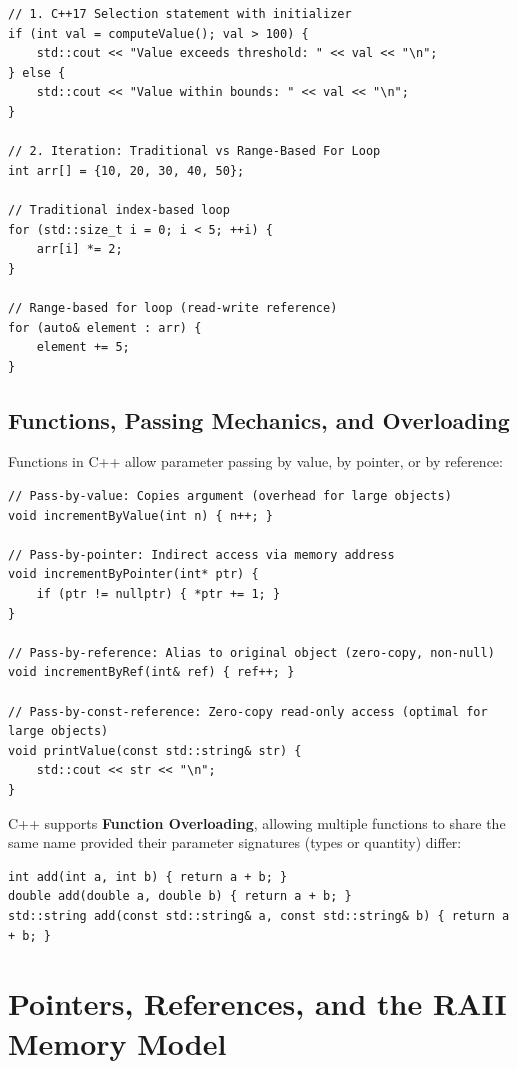 \documentclass[10pt,journal,compsoc,onecolumn]{IEEEtran}
\begin{document}
\begin{verbatim}
// 1. C++17 Selection statement with initializer
if (int val = computeValue(); val > 100) {
    std::cout << "Value exceeds threshold: " << val << "\n";
} else {
    std::cout << "Value within bounds: " << val << "\n";
}

// 2. Iteration: Traditional vs Range-Based For Loop
int arr[] = {10, 20, 30, 40, 50};

// Traditional index-based loop
for (std::size_t i = 0; i < 5; ++i) {
    arr[i] *= 2;
}

// Range-based for loop (read-write reference)
for (auto& element : arr) {
    element += 5;
}
\end{verbatim}

\subsection{Functions, Passing Mechanics, and Overloading}
Functions in C++ allow parameter passing by value, by pointer, or by reference:

\begin{verbatim}
// Pass-by-value: Copies argument (overhead for large objects)
void incrementByValue(int n) { n++; }

// Pass-by-pointer: Indirect access via memory address
void incrementByPointer(int* ptr) {
    if (ptr != nullptr) { *ptr += 1; }
}

// Pass-by-reference: Alias to original object (zero-copy, non-null)
void incrementByRef(int& ref) { ref++; }

// Pass-by-const-reference: Zero-copy read-only access (optimal for large objects)
void printValue(const std::string& str) {
    std::cout << str << "\n";
}
\end{verbatim}

C++ supports \textbf{Function Overloading}, allowing multiple functions to share the same name provided their parameter signatures (types or quantity) differ:

\begin{verbatim}
int add(int a, int b) { return a + b; }
double add(double a, double b) { return a + b; }
std::string add(const std::string& a, const std::string& b) { return a + b; }
\end{verbatim}

\section{Pointers, References, and the RAII Memory Model}
\label{sec:memory}
\end{document}
